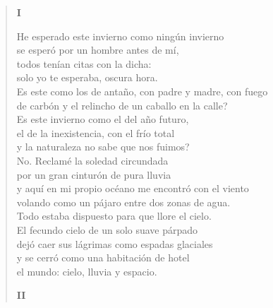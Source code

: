 \documentclass[12pt]{article}
\begin{document}
\clearpage
{}
\begin{verse}

{\bfseries\scshape {I}}

He esperado este invierno como ningún invierno\\
se esperó por un hombre antes de mí,\\
todos tenían citas con la dicha:\\
solo yo te esperaba, oscura hora.\\
Es este como los de antaño, con padre y madre, con fuego\\
de carbón y el relincho de un caballo en la calle?\\
Es este invierno como el del año futuro,\\
el de la inexistencia, con el frío total\\
y la naturaleza no sabe que nos fuimos?\\
No. Reclamé la soledad circundada\\
por un gran cinturón de pura lluvia\\
y aquí en mi propio océano me encontró con el viento\\
volando como un pájaro entre dos zonas de agua.\\
Todo estaba dispuesto para que llore el cielo.\\
El fecundo cielo de un solo suave párpado\\
dejó caer sus lágrimas como espadas glaciales\\
y se cerró como una habitación de hotel\\
el mundo: cielo, lluvia y espacio.  

{\bfseries\scshape {II}}


\end{verse}
\end{document}
